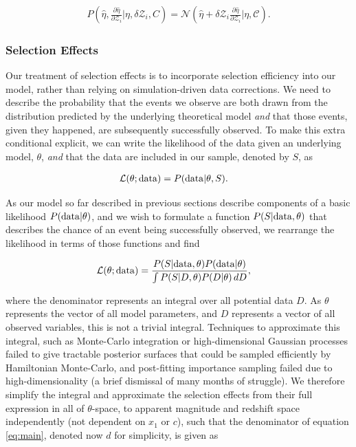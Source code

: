 \documentclass[a4paper,fleqn,usenatbib]{mnras}
\newcommand{\cov}{\mathcal{C}}
\newcommand{\Z}{\mathcal{Z}}
\begin{document}
\begin{align}
P\left(\hat{\eta}, \frac{\partial \hat{\eta}}{\partial \Z_i} | \eta, \delta \Z_i, C\right) = \mathcal{N}\left(\hat{\eta} + \delta \Z_i \frac{\partial \hat{\eta}}{\partial \Z_i}|\eta,\cov\right). \label{eq:l3}
\end{align}



\subsubsection{Selection Effects}
\label{sec:selection}
Our treatment of selection effects is to incorporate selection efficiency into our model, rather than relying on simulation-driven data corrections. We need to describe the probability that the events we observe are both drawn from the distribution predicted by the underlying theoretical model \textit{and} that those events, given they happened, are subsequently successfully observed.  To make this extra conditional explicit, we can write the likelihood of the data given an underlying model, $\theta$, \textit{and} that the data are included in our sample, denoted by $S$, as

\begin{align}
\mathcal{L}(\theta; {\rm data}) &= P({\rm data} | \theta, S). \label{eq:like}
\end{align}

As our model so far described in previous sections describe components of a basic likelihood $P({\rm data}|\theta)$, and we wish to formulate a function $P(S|{\rm data},\theta)$ that describes the chance of an event being successfully observed, we rearrange the likelihood in terms of those functions and find

\begin{align}
\mathcal{L}(\theta; {\rm data}) &= \frac{P(S|{\rm data},\theta) P({\rm data}|\theta)}{\int P(S | D, \theta) P(D|\theta)\, dD}, \label{eq:main}
\end{align}

where the denominator represents an integral over all potential data $D$. As $\theta$ represents the vector of all model parameters, and $D$ represents a vector of all observed variables, this is not a trivial integral. Techniques to approximate this integral, such as Monte-Carlo integration or high-dimensional Gaussian processes failed to give tractable posterior surfaces that could be sampled efficiently by Hamiltonian Monte-Carlo, and post-fitting importance sampling failed due to high-dimensionality (a brief dismissal of many months of struggle). We therefore simplify the integral and approximate the selection effects from their full expression in all of $\theta$-space, to apparent magnitude and redshift space independently (not dependent on $x_1$ or $c$), such that the denominator of equation \eqref{eq:main}, denoted now $d$ for simplicity, is given as
\end{document}
